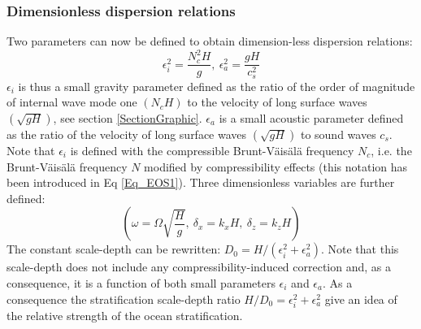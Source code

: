 \documentclass[a4paper,11pt]{article}
\begin{document}
\subsubsection{Dimensionless dispersion relations}
Two parameters can now be defined to obtain dimension-less dispersion relations:
\begin{equation}
     \epsilon_i^2 =  \frac{N_c^2 H}{g} 
    ,\ \epsilon_a^2 = \frac{g H}{c_s^2} 
\end{equation}
$\epsilon_i$ is thus a small gravity parameter defined as the ratio of the order of magnitude of internal wave mode one $(N_c H)$ to the velocity of long surface waves $(\sqrt{gH})$, see section \ref{SectionGraphic}.
$\epsilon_a$ is a small acoustic parameter defined as the ratio of the velocity of long surface waves $(\sqrt{gH})$ to sound waves $c_s$. Note that $\epsilon_i$ is defined with the compressible Brunt-Väisälä frequency $N_c$, i.e. the Brunt-Väisälä frequency $N$ modified by compressibility effects (this notation has been introduced in Eq \ref{Eq_EOS1}). Three dimensionless variables are further defined:
\begin{equation}
    \left( \omega = \Omega \sqrt{\frac{H}{g}}
    ,\ \delta_x = k_x H
    ,\ \delta_z = k_z H \right)
\end{equation}
The constant scale-depth can be rewritten: $D_0=H/(\epsilon_i^2+\epsilon_a^2)$.  Note that this scale-depth does not include any compressibility-induced correction and, as a consequence, it is a function of both small parameters $\epsilon_i$ and $\epsilon_a$. As a consequence the stratification scale-depth ratio $H/D_0=\epsilon_i^2+\epsilon_a^2$ give an idea of the relative strength of the ocean stratification.\\
\end{document}
